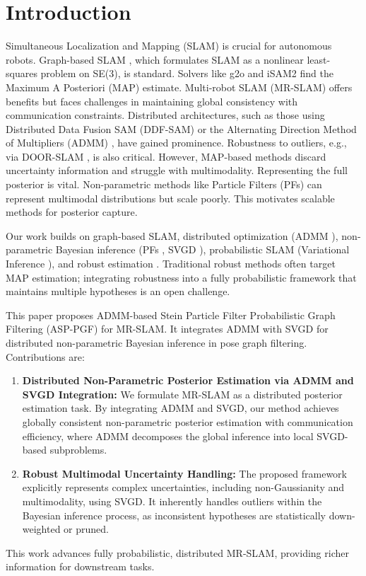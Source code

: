 \section{Introduction}
\label{sec:introduction}

Simultaneous Localization and Mapping (SLAM) \cite{Cadena2016} is crucial for autonomous robots. Graph-based SLAM \cite{Grisetti2010}, which formulates SLAM as a nonlinear least-squares problem on SE(3), is standard. Solvers like g2o \cite{Kuemmerle2011} and iSAM2 \cite{Kaess2012} find the Maximum A Posteriori (MAP) estimate. Multi-robot SLAM (MR-SLAM) offers benefits but faces challenges in maintaining global consistency with communication constraints. Distributed architectures, such as those using Distributed Data Fusion SAM (DDF-SAM) \cite{Cunningham2013} or the Alternating Direction Method of Multipliers (ADMM) \cite{Choudhary2015, Boyd2011, Choudhary2017}, have gained prominence. Robustness to outliers, e.g., via DOOR-SLAM \cite{Lajoie2020}, is also critical.
However, MAP-based methods discard uncertainty information and struggle with multimodality. Representing the full posterior is vital. Non-parametric methods like Particle Filters (PFs) \cite{Montemerlo2002} can represent multimodal distributions but scale poorly. This motivates scalable methods for posterior capture.

Our work builds on graph-based SLAM, distributed optimization (ADMM \cite{Boyd2011, Choudhary2015}), non-parametric Bayesian inference (PFs \cite{Montemerlo2002}, SVGD \cite{Liu2016, Pavlasek2023, Koide2024MegaParticles}), probabilistic SLAM (Variational Inference \cite{Cao2024}), and robust estimation \cite{Agarwal2013, Sunderhauf2012, Olson2013, Yang2020, Latif2013, Mangelson2018}.
Traditional robust methods often target MAP estimation; integrating robustness into a fully probabilistic framework that maintains multiple hypotheses is an open challenge.

This paper proposes ADMM-based Stein Particle Filter Probabilistic Graph Filtering (ASP-PGF) for MR-SLAM. It integrates ADMM with SVGD for distributed non-parametric Bayesian inference in pose graph filtering.
Contributions are:
\begin{enumerate}
    \item \textbf{Distributed Non-Parametric Posterior Estimation via ADMM and SVGD Integration:} We formulate MR-SLAM as a distributed posterior estimation task. By integrating ADMM and SVGD, our method achieves globally consistent non-parametric posterior estimation with communication efficiency, where ADMM decomposes the global inference into local SVGD-based subproblems.
    \item \textbf{Robust Multimodal Uncertainty Handling:} The proposed framework explicitly represents complex uncertainties, including non-Gaussianity and multimodality, using SVGD. It inherently handles outliers within the Bayesian inference process, as inconsistent hypotheses are statistically down-weighted or pruned.
\end{enumerate}
This work advances fully probabilistic, distributed MR-SLAM, providing richer information for downstream tasks.
